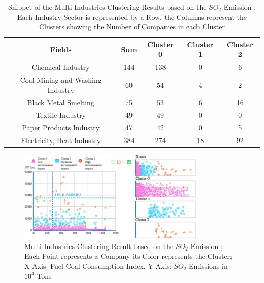 \begin{table}[h]
    \centering
    \begin{tabular}{c|c|c|c|c}
        \textbf{Fields} & \textbf{Sum} & \textbf{Cluster 0} & \textbf{Cluster 1} & \textbf{Cluster 2} \\
        \hline
        Chemical Industry & 144 & 138 & 0 & 6 \\
        Coal Mining and Washing Industry & 60 & 54 & 4 & 2 \\
        Black Metal Smelting & 75 & 53 & 6 & 16 \\
        Textile Industry & 49 & 49 & 0 & 0 \\
        Paper Products Industry & 47 & 42 & 0 & 5 \\
        Electricity, Heat Industry & 384 & 274 & 18 & 92 \\
    \end{tabular}
    \caption{Snippet of the Multi-Industries Clustering Results based on the $SO_2$ Emission \cite{LIU-BDE};
    Each Industry Sector is represented by a Row, the Columns represent the Clusters showing the Number of Companies in each Cluster}
    \label{tab:multi_industries_clustering_results_based_on_the_so2_emission}
\end{table}

\begin{figure}
    \centering
    \includegraphics[width=0.8\textwidth]{figures/liu_assessmentOfIndustries/liu_environmentalPerformance.jpg}
    \caption{Multi-Industries Clustering Result based on the $SO_2$ Emission \cite{LIU-BDE};
    Each Point represents a Company its Color represents the Cluster;
    X-Axis: Fuel-Coal Consumption Index, Y-Axis: $SO_2$ Emissions in $10^4$ Tons}
    \label{fig:multi_industries_clustering_result_environemental_performance}
\end{figure}

